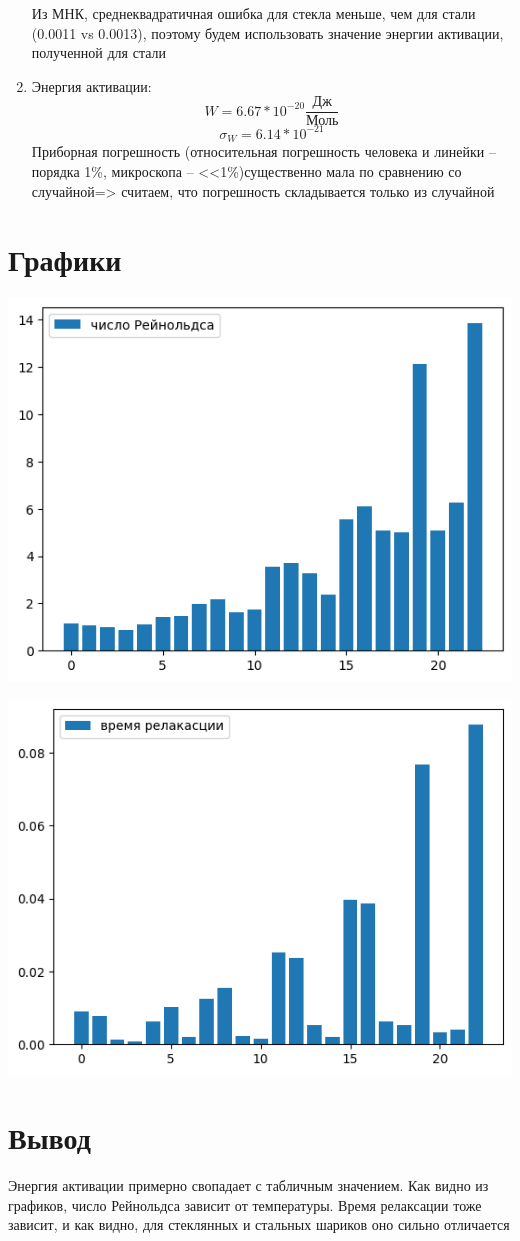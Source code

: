\documentclass[11pt,a4paper]{article}
\begin{document}
\begin{enumerate}
\begin{center}
  \end{center}
  Из МНК, среднеквадратичная ошибка для стекла меньше, чем для стали (0.0011 vs 0.0013), поэтому будем использовать
  значение энергии активации, полученной для стали
  \item Энергия активации:
  \[W = 6.67 * 10 ^ {-20}\frac{\text{Дж}}{\text{Моль}}\]
  \[\sigma_W =  6.14 * 10 ^ {-21}\]
  Приборная погрешность (относительная погрешность человека и линейки -- порядка 1\%, микроскопа -- <<1\%)существенно мала по сравнению со случайной=>
  считаем, что погрешность складывается только из случайной
\end{enumerate}
\section*{Графики}
\begin{center}
  \includegraphics{re}
\end{center}
\begin{center}
  \includegraphics{t}
\end{center}
\section*{Вывод}
Энергия активации примерно свопадает с табличным значением.
Как видно из графиков, число Рейнольдса зависит от температуры.
Время релаксации тоже зависит, и как видно, для стеклянных и стальных шариков оно сильно отличается
\end{document}
